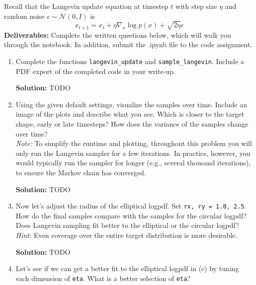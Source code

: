 \documentclass{article}
\newenvironment{solution}{\color{blue} \smallskip \textbf{Solution:}}{}
\begin{document}
Recall that the Langevin update equation at timestep $t$ with step size $\eta$ and random noise $\epsilon \sim \mathcal{N}(0,I)$ is
\[
    x_{t+1} = x_t + \eta\nabla_x \log p(x) + \sqrt{2\eta}\epsilon
\]
\textbf{Deliverables:} Complete the written questions below, which will walk you through the notebook. In addition, submit the .ipynb file to the code assignment.

\begin{enumerate}
    \item 
    Complete the functions \texttt{langevin\_update} and \texttt{sample\_langevin}. Include a PDF export of the completed code in your write-up.

    \begin{solution}
        TODO
    \end{solution}

    \item
    Using the given default settings, visualize the samples over time. 
    Include an image of the plots and describe what you see. 
    Which is closer to the target shape, early or late timesteps? 
    How does the variance of the samples change over time? \\
    \textit{Note:} To simplify the runtime and plotting, throughout this problem you will only run the Langevin sampler for a few iterations. 
    In practice, however, you would typically run the sampler for longer (e.g., several thousand iterations), to ensure the Markov chain has converged.

    \begin{solution}
        TODO
    \end{solution}

    \item 
    Now let's adjust the radius of the elliptical logpdf. 
    Set \texttt{rx, ry = 1.0, 2.5}. 
    How do the final samples compare with the samples for the circular logpdf? 
    Does Langevin sampling fit better to the elliptical or the circular logpdf? \\
    \textit{Hint:} Even coverage over the entire target distribution is more desirable.

    \begin{solution}
        TODO
    \end{solution}

    \item 
    Let's see if we can get a better fit to the elliptical logpdf in (c) by tuning each dimension of \texttt{eta}. 
    What is a better selection of \texttt{eta}?


\end{enumerate}
\end{document}
